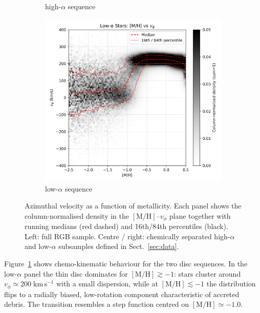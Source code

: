 \documentclass[a4paper,12pt]{article}
\begin{document}
\begin{figure}
\begin{subfigure}[b]{0.32\textwidth}
    \caption{high-$\alpha$ sequence}
  \end{subfigure}\hfill
  \begin{subfigure}[b]{0.32\textwidth}
    \includegraphics[width=\textwidth]{../figures/vis_mh_vphi_low_alpha.png}
    \caption{low-$\alpha$ sequence}
  \end{subfigure}

  \caption{Azimuthal velocity as a function of metallicity. 
           Each panel shows the column-normalised density in the
           $[\mathrm{M/H}]$–$v_\phi$ plane together with running medians
           (red dashed) and 16th/84th percentiles (black).  
           Left: full RGB sample.  Centre / right: chemically separated
           high-$\alpha$ and low-$\alpha$ subsamples defined in
           Sect.~\ref{sec:data}.}
  \label{fig:mh_vphi_alpha}
\end{figure}

Figure~\ref{fig:mh_vphi_alpha} shows chemo-kinematic
behaviour for the two disc sequences.  
In the low-$\alpha$ panel the thin disc dominates
for $[\mathrm{M/H}]\gtrsim-1$: stars cluster around
$v_\phi\!\simeq\!200\;\mathrm{km\,s^{-1}}$ with a small dispersion,
while at $[\mathrm{M/H}]\lesssim-1$ the distribution flips to a radially
biased, low-rotation component characteristic of accreted debris.
The transition resembles a step function centred on
$[\mathrm{M/H}]\simeq-1.0$.
\end{document}

